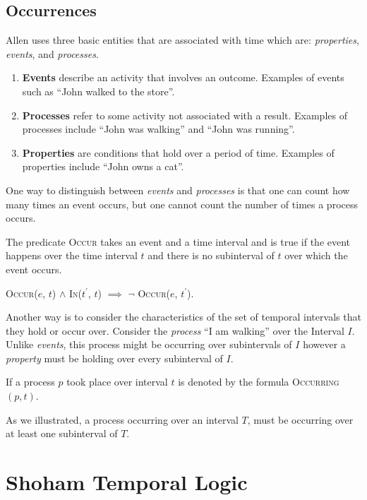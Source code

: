 \subsection{Occurrences}
Allen uses three basic entities that are associated with time which are: \textit{properties}, \textit{events}, and \textit{processes}.
\begin{enumerate}
	\item \textbf{Events} describe an activity that involves an outcome. Examples of events such as ``John walked to the store''.

	\item \textbf{Processes} refer to some activity not associated with a result. Examples of processes include ``John was walking'' and ``John was running''.

	\item \textbf{Properties} are conditions that hold over a period of time. Examples of properties include ``John owns a cat''.
\end{enumerate}
One way to distinguish between \textit{events} and \textit{processes} is that one can count how many times an event occurs, but one cannot count
the number of times a process occurs.


The predicate \textsc{Occur} takes an event and a time interval and is true if the event happens over the time interval $t$ and there is no subinterval of $t$
over which the event occurs.

\begin{center}
	\textsc{Occur}($e$, $t$) $\land$ \textsc{In}($t^\prime$, $t$) $\implies$ \(\lnot\) \textsc{Occur}($e$, $t^\prime$).
\end{center}

Another way is to consider the characteristics of the set of temporal intervals that they hold or occur over.
Consider the \textit{process} ``I am walking'' over the Interval $I$. Unlike \textit{events}, this process might be occurring over subintervals of $I$ however a \textit{property} must be holding over every subinterval of $I$.


If a process $p$ took place over interval $t$ is denoted by the formula \textsc{Occurring}$(p,t)$.


As we illustrated, a process occurring over an interval $T$, must be occurring over at least one subinterval of $T$.

\section{Shoham Temporal Logic}

